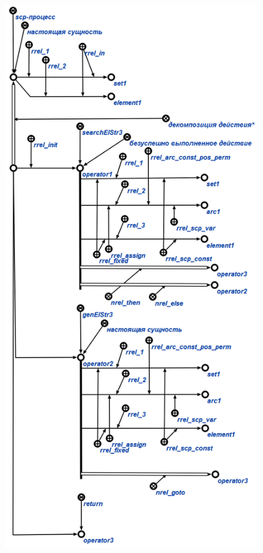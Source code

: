 \begin{SCn}
{{\begin{figure}[H]
\end{figure}
\begin{figure}[H]
\includegraphics[width=0.6\linewidth]{figures/sd_scp/examplescp3.png}
\end{figure}
\begin{figure}[H]

\end{figure}}}
\end{SCn}

